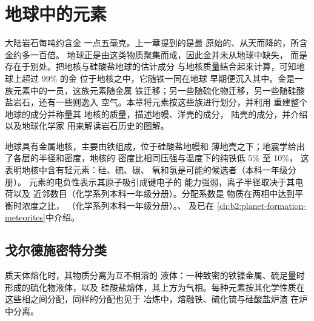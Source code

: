 \chapter{地球中的元素}\label{ch:b2:elements-in-the-earth}

大陆岩石每吨约含金
一点五毫克。上一章提到的是最
原始的、从天而降的，所含金约多一百倍。
地球正是由这类物质聚集而成，因此金并未从地球中缺失，
而是存在于别处。把地核与硅酸盐地球的估计成分
与地核质量结合起来计算，可知地球上超过 99\% 的金
位于地核之中，它随铁一同在地球
早期便沉入其中。金是一族元素中的一员，这族元素随金属
铁迁移；另一些随硫化物迁移，另一些随硅酸盐岩石，还有一些则逸入
空气。本章将元素按这些族进行划分，并利用
重建整个地球的成分并称量其
地核的质量，描述地幔、洋壳的成分，
陆壳的成分，并介绍以及地球化学家
用来解读岩石历史的图解。

\begin{recall}
地球具有金属地核，主要由铁组成，位于硅酸盐地幔和
薄地壳之下；地震学给出了各层的半径和密度，地核的
密度比相同压强与温度下的纯铁低 5\% 至 10\%，
这表明地核中含有轻元素：硅、硫、碳、
氧和氢是可能的候选者（本科一年级分册）。
元素的电负性表示其原子吸引成键电子的
能力强弱，离子半径取决于其电荷以及
近邻数目（化学系列本科一年级分册）。分配系数是
物质在两相中达到平衡时浓度之比，
（化学系列本科一年级分册）。、
及已在
\cref{ch:b2:planet-formation-meteorites}中介绍。
\end{recall}

\section{戈尔德施密特分类}

质天体熔化时，其物质分离为互不相溶的
液体：一种致密的铁镍金属、硫足量时形成的硫化物液体，以及
硅酸盐熔体，其上方为气相。每种元素按其化学性质在
这些相之间分配，同样的分配也见于
冶炼中，熔融铁、硫化锍与硅酸盐炉渣
在炉中分离。

